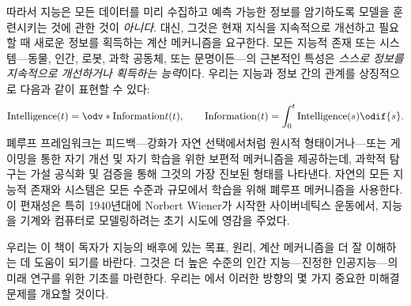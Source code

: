 \documentclass[../../book-main_ko.tex]{subfiles}
\begin{document}
따라서 지능은 모든 데이터를 미리 수집하고 예측 가능한 정보를 암기하도록 모델을 훈련시키는 것에 관한 것이 \textit{아니다}. 대신, 그것은 현재 지식을 지속적으로 개선하고 필요할 때 새로운 정보를 획득하는 계산 메커니즘을 요구한다. 모든 지능적 존재 또는 시스템---동물, 인간, 로봇, 과학 공동체, 또는 문명이든---의 근본적인 특성은 \textit{스스로 정보를 지속적으로 개선하거나 획득하는 능력}이다. 우리는 지능과 정보 간의 관계를 상징적으로 다음과 같이 표현할 수 있다:
\begin{equation}
    \operatorname{Intelligence}(t) = \odv*{\operatorname{Information}}{t}(t), \qquad
    \operatorname{Information}(t)  = \int_{0}^{t} \operatorname{Intelligence}(s) \odif{s}.
\end{equation}
폐루프 프레임워크는 피드백---강화가 자연 선택에서처럼 원시적 형태이거나---또는 게이밍을 통한 자기 개선 및 자기 학습을 위한 보편적 메커니즘을 제공하는데, 과학적 탐구는 가설 공식화 및 검증을 통해 그것의 가장 진보된 형태를 나타낸다. 자연의 모든 지능적 존재와 시스템은 모든 수준과 규모에서 학습을 위해 폐루프 메커니즘을 사용한다. 이 편재성은 특히 1940년대에 Norbert Wiener가 시작한 사이버네틱스 운동에서, 지능을 기계와 컴퓨터로 모델링하려는 초기 시도에 영감을 주었다.

우리는 이 책이 독자가 지능의 배후에 있는 목표, 원리, 계산 메커니즘을 더 잘 이해하는 데 도움이 되기를 바란다. 그것은 더 높은 수준의 인간 지능---진정한 인공지능---의 미래 연구를 위한 기초를 마련한다. 우리는 에서 이러한 방향의 몇 가지 중요한 미해결 문제를 개요할 것이다.
\end{document}
